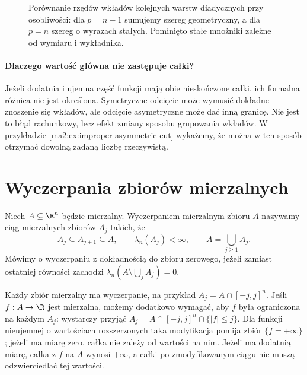 \begin{figure}[htbp]
\centering
{}
\caption{Porównanie rzędów wkładów kolejnych
warstw diadycznych przy osobliwości: dla
$p=n-1$ sumujemy szereg geometryczny,
a dla $p=n$ szereg o wyrazach stałych.
Pominięto stałe mnożniki zależne od wymiaru
i wykładnika.}
\label{ma2:fig:improper-shell-contributions}
\end{figure}

\paragraph{Dlaczego wartość główna nie zastępuje całki?}
Jeżeli dodatnia i ujemna część funkcji
mają obie nieskończone całki, ich formalna
różnica nie jest określona. Symetryczne
odcięcie może wymusić dokładne znoszenie
się wkładów, ale odcięcie asymetryczne
może dać inną granicę. Nie jest to błąd
rachunkowy, lecz efekt zmiany sposobu
grupowania wkładów. W przykładzie
\ref{ma2:ex:improper-asymmetric-cut}
wykażemy, że można w ten sposób otrzymać
dowolną zadaną liczbę rzeczywistą.

\section{Wyczerpania zbiorów mierzalnych}

\begin{definicja}
\label{ma2:def:integral-exhaustion}
Niech $A\subseteq\R^n$ będzie mierzalny.
Wyczerpaniem mierzalnym zbioru $A$ nazywamy
ciąg mierzalnych zbiorów $A_j$ takich, że
\[
 A_j\subseteq A_{j+1}\subseteq A,\qquad
 \lambda_n(A_j)<\infty,\qquad
 A=\bigcup_{j\ge1}A_j.
\]
Mówimy o wyczerpaniu z dokładnością do zbioru zerowego,
jeżeli zamiast ostatniej równości zachodzi
$\lambda_n(A\setminus\bigcup_j A_j)=0$.
\end{definicja}

Każdy zbiór mierzalny ma wyczerpanie, na przykład
$A_j=A\cap[-j,j]^n$. Jeśli $f:A\to\R$ jest
mierzalna, możemy dodatkowo wymagać, aby $f$
była ograniczona na każdym $A_j$: wystarczy
przyjąć $A_j=A\cap[-j,j]^n\cap\{|f|\le j\}$.
Dla funkcji nieujemnej o wartościach rozszerzonych
taka modyfikacja pomija zbiór $\{f=+\infty\}$;
jeżeli ma miarę zero, całka nie zależy od wartości
na nim. Jeżeli ma dodatnią miarę, całka z $f$
na $A$ wynosi $+\infty$, a całki po zmodyfikowanym
ciągu nie muszą odzwierciedlać tej wartości.

